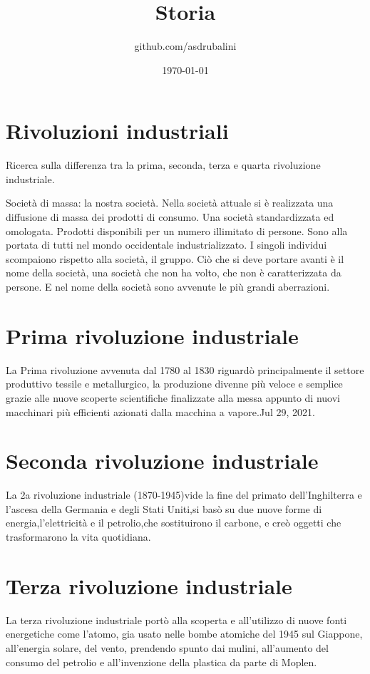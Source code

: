 \documentclass{article}
\title{Storia}
\author{github.com/asdrubalini}
\date{\today}
\begin{document}
    \maketitle

    \section{Rivoluzioni industriali}
    Ricerca sulla differenza tra la prima, seconda, terza e quarta rivoluzione industriale.

    Società di massa: la nostra società. Nella società attuale si è realizzata una diffusione di massa
    dei prodotti di consumo. Una società standardizzata ed omologata. Prodotti disponibili per un numero
    illimitato di persone. Sono alla portata di tutti nel mondo occidentale industrializzato.
    \newline
    I singoli individui scompaiono rispetto alla società, il gruppo. Ciò che si deve portare avanti è
    il nome della società, una società che non ha volto, che non è caratterizzata da persone. E nel nome 
    della società sono avvenute le più grandi aberrazioni.

    \section{Prima rivoluzione industriale}
    La Prima rivoluzione avvenuta dal 1780 al 1830 riguardò principalmente il settore produttivo tessile e metallurgico, la produzione divenne più veloce e semplice grazie alle nuove scoperte scientifiche finalizzate alla messa appunto di nuovi macchinari più efficienti azionati dalla macchina a vapore.Jul 29, 2021.

    \section{Seconda rivoluzione industriale}
    La 2a rivoluzione industriale (1870-1945)vide la fine del primato dell'Inghilterra e l'ascesa della Germania e degli Stati Uniti,si basò su due nuove forme di energia,l'elettricità e il petrolio,che sostituirono il carbone, e creò oggetti che trasformarono la vita quotidiana.

    \section{Terza rivoluzione industriale}
    La terza rivoluzione industriale portò alla scoperta e all'utilizzo di nuove fonti energetiche come l'atomo, gia usato nelle bombe atomiche del 1945 sul Giappone, all'energia solare, del vento, prendendo spunto dai mulini, all'aumento del consumo del petrolio e all'invenzione della plastica da parte di Moplen.
\end{document}
